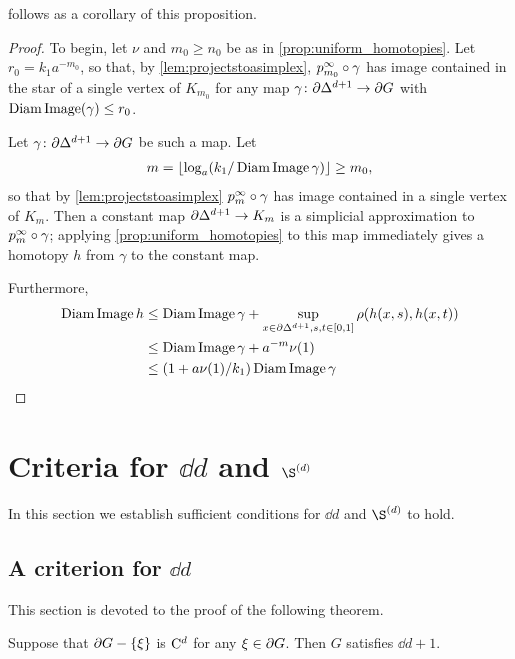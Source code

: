 \documentclass[a4paper]{article}
\begin{document}
 follows as a corollary of this proposition.

\ddagimpliesLCd*

\begin{proof}
  To begin, let $\nu$ and $m_0 \geq n_0$ be as in
  \cref{prop:uniform_homotopies}. Let $r_0 =
  k_1a^{-m_0}$, so that, by \cref{lem:projectstoasimplex},
  $p^\infty_{m_0}\circ\gamma$ has image contained in the star of a single
  vertex of $K_{m_0}$ for any map $\gamma\colon\partial\Delta^{d+1}\to\partial
  G$ with $\operatorname{Diam}\operatorname{Image}(\gamma)\leq r_0$.

  Let $\gamma\colon\partial\Delta^{d+1}\to\partial G$ be such a map. Let 
  \begin{align*}
    m = \lfloor\log_a(k_1/\operatorname{Diam}\operatorname{Image}\gamma)\rfloor \geq m_0,
  \end{align*}
  so that by \cref{lem:projectstoasimplex} $p^\infty_{m}\circ\gamma$ has
  image contained in a single vertex of $K_m$. Then a constant map
  $\partial\Delta^{d+1} \to K_m$ is a simplicial approximation to
  $p^\infty_m\circ\gamma$; applying \cref{prop:uniform_homotopies} to
  this map immediately gives a homotopy $h$ from $\gamma$ to the constant map.

  Furthermore,
  \begin{align*}
    \operatorname{Diam}\operatorname{Image} h &\leq \operatorname{Diam}\operatorname{Image}\gamma + \sup_{x \in\partial\Delta^{d+1}, s,t \in [0,1]} \rho(h(x,s), h(x,t)) \\
                  &\leq \operatorname{Diam}\operatorname{Image}\gamma + a^{-m} \nu(1) \\
                  &\leq (1 + a\nu(1)/k_1) \operatorname{Diam}\operatorname{Image}\gamma \qedhere
  \end{align*}
\end{proof}

\section{Criteria for $\dd{d}$ and $\Sd{d}$}\label{sec:dd}

In this section we establish sufficient conditions for $\dd{d}$ and $\Sd{d}$ to 
hold. 

\subsection{A criterion for $\dd{d}$}

This section is devoted to the proof of the following theorem.

\begin{theorem}\label{thm:nocutpointimpliesdagger}
  Suppose that $\partial G - \left\{\xi\right\}$ is $\mathrm{C}^{d}$ for any $\xi \in \partial G$. 
  Then $G$ satisfies $\dd{d+1}$.
\end{theorem}
\end{document}
